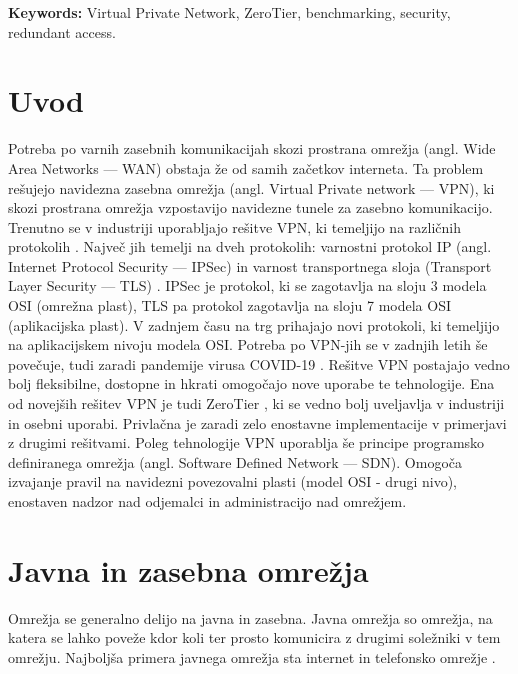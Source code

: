 \documentclass[a4paper, 12pt]{book}
\newcommand{\tkeywordsEn}{Virtual Private Network, ZeroTier, benchmarking, security, redundant access}
\newcommand{\clearemptydoublepage}{\newpage{\pagestyle{empty}\cleardoublepage}}
\begin{document}
\noindent\textbf{Keywords:} \tkeywordsEn.
\clearemptydoublepage

\mainmatter
\setcounter{page}{1}
\pagestyle{fancy}

\chapter{Uvod}
Potreba po varnih zasebnih komunikacijah skozi prostrana omrežja (angl. Wide Area Networks --- WAN) obstaja že od samih začetkov interneta. Ta problem rešujejo navidezna zasebna omrežja (angl. Virtual Private network --- VPN), ki skozi prostrana omrežja vzpostavijo navidezne tunele za zasebno komunikacijo. Trenutno se v industriji uporabljajo rešitve VPN, ki temeljijo na različnih protokolih \cite{noauthor_6_2021}. Največ jih temelji na dveh protokolih: varnostni protokol IP (angl. Internet Protocol Security --- IPSec) \cite{frankel_ip_2011} in varnost transportnega sloja (Transport Layer Security --- TLS) \cite{eastlake_3rd_transport_2011}. IPSec je protokol, ki se zagotavlja na sloju 3 modela OSI (omrežna plast), TLS pa protokol zagotavlja na sloju 7 modela OSI (aplikacijska plast). V zadnjem času na trg prihajajo novi protokoli, ki temeljijo na aplikacijskem nivoju modela OSI. Potreba po VPN-jih se v zadnjih letih še povečuje, tudi zaradi pandemije virusa COVID-19 \cite{m_s_impact_2020}. Rešitve VPN postajajo vedno bolj fleksibilne, dostopne in hkrati omogočajo nove uporabe te tehnologije. Ena od novejših rešitev VPN je tudi ZeroTier \cite{noauthor_protocol_nodate}, ki se vedno bolj uveljavlja v industriji in osebni uporabi. Privlačna je zaradi zelo enostavne implementacije v primerjavi z drugimi rešitvami. Poleg tehnologije VPN uporablja še principe programsko definiranega omrežja (angl. Software Defined Network --- SDN). Omogoča izvajanje pravil na navidezni povezovalni plasti (model OSI - drugi nivo), enostaven nadzor nad odjemalci in administracijo nad omrežjem.


\chapter{Javna in zasebna omrežja}
Omrežja se generalno delijo na javna in zasebna. Javna omrežja so omrežja, na katera se lahko poveže kdor koli ter prosto komunicira z drugimi soležniki v tem omrežju. Najboljša primera javnega omrežja sta internet in telefonsko omrežje \cite{scott_virtual_1999}.
\end{document}
